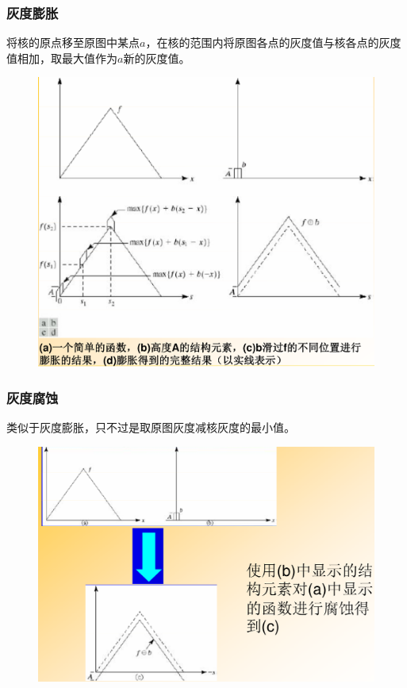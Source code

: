 \documentclass[11pt]{article}
\begin{document}
\subsubsection{灰度膨胀}
将核的原点移至原图中某点$a$，在核的范围内将原图各点的灰度值与核各点的灰度值相加，取最大值作为$a$新的灰度值。
\begin{figure}[htb]
    \centering
    \includegraphics[scale=0.1]{imgs/gray_dilate.png}
\end{figure}

\subsubsection{灰度腐蚀}
类似于灰度膨胀，只不过是取原图灰度减核灰度的最小值。
\begin{figure}[htb]
    \centering
    \includegraphics[scale=0.1]{imgs/gray_erode.png}
\end{figure}
\end{document}
